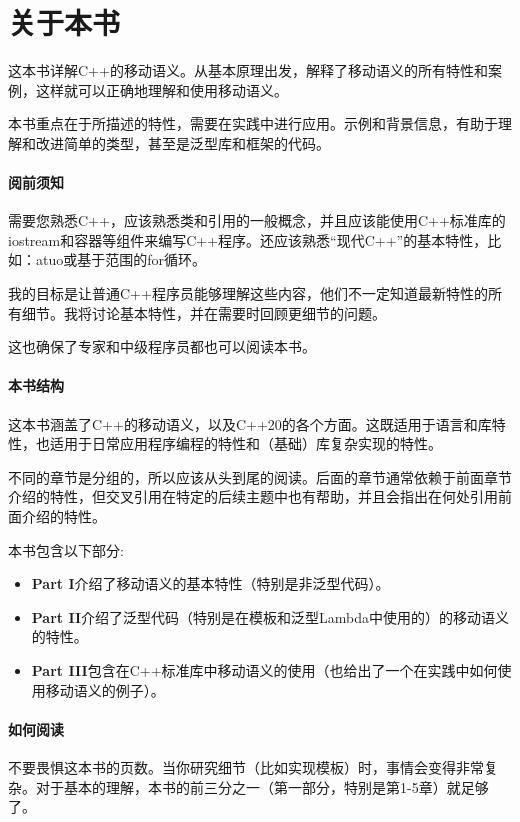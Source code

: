 \chapter{关于本书}

这本书详解C++的移动语义。从基本原理出发，解释了移动语义的所有特性和案例，这样就可以正确地理解和使用移动语义。

本书重点在于所描述的特性，需要在实践中进行应用。示例和背景信息，有助于理解和改进简单的类型，甚至是泛型库和框架的代码。

\subsubsection{阅前须知}

需要您熟悉C++，应该熟悉类和引用的一般概念，并且应该能使用C++标准库的iostream和容器等组件来编写C++程序。还应该熟悉“现代C++”的基本特性，比如：atuo或基于范围的for循环。

我的目标是让普通C++程序员能够理解这些内容，他们不一定知道最新特性的所有细节。我将讨论基本特性，并在需要时回顾更细节的问题。

这也确保了专家和中级程序员都也可以阅读本书。


\subsubsection{本书结构}

这本书涵盖了C++的移动语义，以及C++20的各个方面。这既适用于语言和库特性，也适用于日常应用程序编程的特性和（基础）库复杂实现的特性。

不同的章节是分组的，所以应该从头到尾的阅读。后面的章节通常依赖于前面章节介绍的特性，但交叉引用在特定的后续主题中也有帮助，并且会指出在何处引用前面介绍的特性。

本书包含以下部分:
\begin{itemize}
	\item \textbf{Part I}介绍了移动语义的基本特性（特别是非泛型代码）。
	\item \textbf{Part II}介绍了泛型代码（特别是在模板和泛型Lambda中使用的）的移动语义的特性。
	\item \textbf{Part III}包含在C++标准库中移动语义的使用（也给出了一个在实践中如何使用移动语义的例子）。
\end{itemize}


\subsubsection{如何阅读}

不要畏惧这本书的页数。当你研究细节（比如实现模板）时，事情会变得非常复杂。对于基本的理解，本书的前三分之一（第一部分，特别是第1-5章）就足够了。


